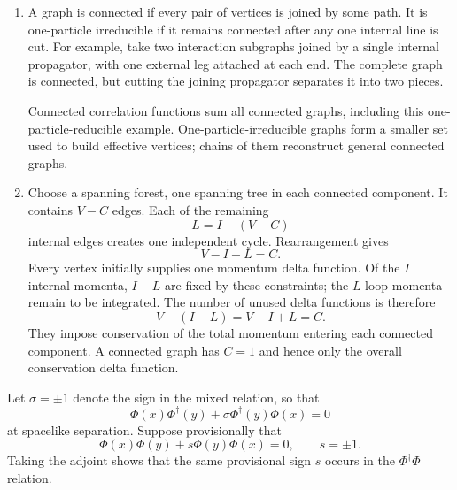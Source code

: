 \begin{enumerate}
\begin{enumerate}
A vacuum bubble touches no external point.  By contrast, a diagram may
have two separate components, each attached to some external points.
Such a diagram survives vacuum normalization but is removed when one
passes from the full correlator to its connected part.
\item
A graph is connected if every pair of vertices is joined by some path.  It
is one-particle irreducible if it remains connected after any one
internal line is cut.  For example, take two interaction subgraphs joined
by a single internal propagator, with one external leg attached at each
end.  The complete graph is connected, but cutting the joining propagator
separates it into two pieces.

Connected correlation functions sum all connected graphs, including this
one-particle-reducible example.  One-particle-irreducible graphs form a
smaller set used to build effective vertices; chains of them reconstruct
general connected graphs.
\item
Choose a spanning forest, one spanning tree in each connected component.
It contains \(V-C\) edges.  Each of the remaining
\[
 L=I-(V-C)
\]
internal edges creates one independent cycle.  Rearrangement gives
\[
 V-I+L=C.
\]
Every vertex initially supplies one momentum delta function.  Of the
\(I\) internal momenta, \(I-L\) are fixed by these constraints; the
\(L\) loop momenta remain to be integrated.  The number of unused delta
functions is therefore
\[
 V-(I-L)=V-I+L=C.
\]
They impose conservation of the total momentum entering each connected
component.  A connected graph has \(C=1\) and hence only the overall
conservation delta function.
\end{enumerate}

Let \(\sigma=\pm1\) denote the sign in the mixed relation, so that
\[
 \Phi(x)\Phi^\dagger(y)
 +\sigma\Phi^\dagger(y)\Phi(x)=0
\]
at spacelike separation.  Suppose provisionally that
\[
 \Phi(x)\Phi(y)+s\Phi(y)\Phi(x)=0,
 \qquad s=\pm1.
\]
Taking the adjoint shows that the same provisional sign \(s\) occurs in
the \(\Phi^\dagger\Phi^\dagger\) relation.


\end{enumerate}
